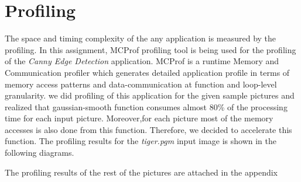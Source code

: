 \section{Profiling}

The space and timing complexity of the any application is measured by the profiling. In this assignment, MCProf profiling tool is being used for the profiling of the  \emph{Canny Edge Detection} application. MCProf is a  runtime Memory and Communication profiler which generates detailed application profile in terms of memory access patterns and data-communication at function and loop-level granularity. we did  profiling  of this application for the given sample pictures and realized that gaussian-smooth function consumes almost 80\% of the processing time for each input picture. Moreover,for each picture most of the memory accesses is also done from this function. Therefore, we decided to accelerate this function. The profiling results for the \emph{tiger.pgm} input image is shown in the  following diagrams. 

The profiling results of the rest of the pictures are attached in the appendix